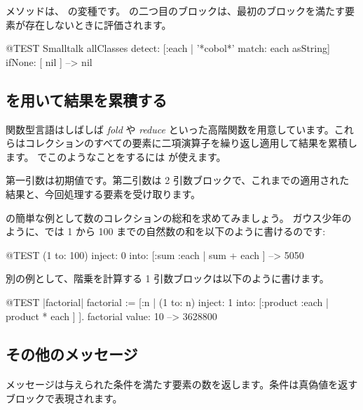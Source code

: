 \documentclass[a4paper,10pt,twoside]{book}
\begin{document}

 メソッドは、 の変種です。
 の二つ目のブロックは、最初のブロックを満たす要素が存在しないときに評価されます。

\begin{code}{@TEST}
Smalltalk allClasses detect: [:each | '*cobol*' match: each asString] ifNone: [ nil ] --> nil
\end{code}

\subsection{ を用いて結果を累積する}
関数型言語はしばしば \emph{fold} や \emph{reduce} といった高階関数を用意しています。これらはコレクションのすべての要素に二項演算子を繰り返し適用して結果を累積します。
\pharo でこのようなことをするには  が使えます。

第一引数は初期値です。第二引数は 2 引数ブロックで、これまでの適用された結果と、今回処理する要素を受け取ります。

 の簡単な例として数のコレクションの総和を求めてみましょう。
ガウス少年のように、\pharo では 1 から 100 までの自然数の和を以下のように書けるのです:
\begin{code}{@TEST}
(1 to: 100) inject: 0 into: [:sum :each | sum + each ] --> 5050
\end{code}

別の例として、階乗を計算する 1 引数ブロックは以下のように書けます。
\begin{code}{@TEST |factorial|}
factorial := [:n | (1 to: n) inject: 1 into: [:product :each | product * each ] ].
factorial value: 10 --> 3628800
\end{code}

\subsection{その他のメッセージ}

\paragraph{}   メッセージは与えられた条件を満たす要素の数を返します。条件は真偽値を返すブロックで表現されます。
\end{document}
